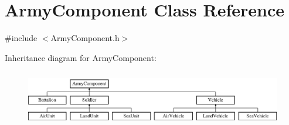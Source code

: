 \hypertarget{class_army_component}{}\section{Army\+Component Class Reference}
\label{class_army_component}


{\ttfamily \#include $<$Army\+Component.\+h$>$}

Inheritance diagram for Army\+Component\+:\begin{figure}[H]
\begin{center}
\leavevmode
\includegraphics[height=2.477876cm]{class_army_component}
\end{center}
\end{figure}

